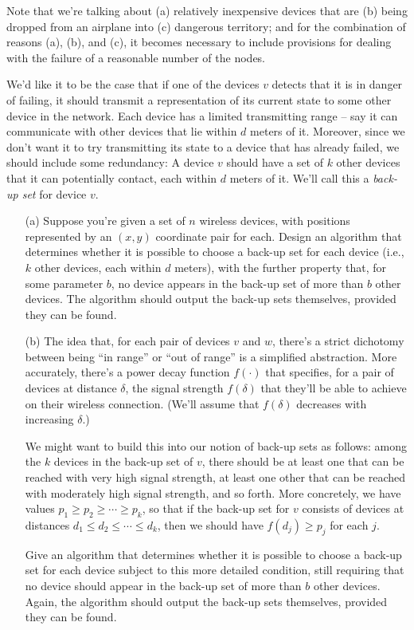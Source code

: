 \documentclass[12pt,letterpaper]{article}
\begin{document}
Note that we're talking about (a) relatively inexpensive devices that
are (b) being dropped from an airplane into (c) dangerous territory; and
for the combination of reasons (a), (b), and (c), it becomes necessary to
include provisions for dealing with the failure of a reasonable number of
the nodes.

We'd like it to be the case that if one of the devices $v$ detects that it is in
danger of failing, it should transmit a representation of its current state to
some other device in the network. Each device has a limited transmitting
range -- say it can communicate with other devices that lie within $d$ meters
of it. Moreover, since we don't want it to try transmitting its state to a
device that has already failed, we should include some redundancy: A
device $v$ should have a set of $k$ other devices that it can potentially contact,
each within $d$ meters of it. We'll call this a \emph{back-up set} for device $v$.

\begin{itemize}
\item[(a)] Suppose you're given a set of $n$ wireless devices, with positions
represented by an $(x, y)$ coordinate pair for each. Design an algorithm
that determines whether it is possible to choose a back-up set for
each device (i.e., $k$ other devices, each within $d$ meters), with the
further property that, for some parameter $b$, no device appears in
the back-up set of more than $b$ other devices. The algorithm should
output the back-up sets themselves, provided they can be found.

\item[(b)] The idea that, for each pair of devices $v$ and $w$, there's a strict
dichotomy between being ``in range'' or ``out of range'' is a simplified
abstraction. More accurately, there's a power decay function $f(\cdot)$ that
specifies, for a pair of devices at distance $\delta$, the signal strength $f(\delta)$
that they'll be able to achieve on their wireless connection. (We'll
assume that $f(\delta)$ decreases with increasing $\delta$.)

We might want to build this into our notion of back-up sets as
follows: among the $k$ devices in the back-up set of $v$, there should
be at least one that can be reached with very high signal strength,
at least one other that can be reached with moderately high signal
strength, and so forth. More concretely, we have values $p_1 \ge p_2 \ge\cdots \ge
p_k$, so that if the back-up set for $v$ consists of devices at distances
$d_1 \le d_2 \le \cdots\le d_k$, then we should have $f(d_j) \ge p_j$ for each $j$.

Give an algorithm that determines whether it is possible to
choose a back-up set for each device subject to this more detailed
condition, still requiring that no device should appear in the back-up
set of more than $b$ other devices. Again, the algorithm should output
the back-up sets themselves, provided they can be found.
\end{itemize}
\end{document}
